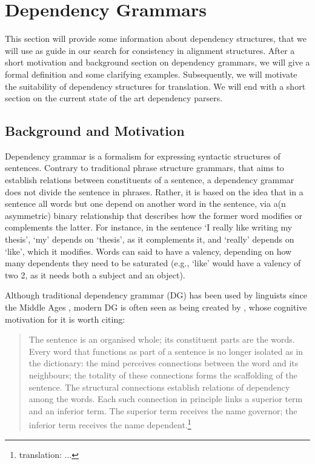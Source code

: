 \documentclass{report}
\theoremstyle{definition}
\theoremstyle{plain}
\begin{document}
\newpage

\section{Dependency Grammars}
\label{sec:depgram}

This section will provide some information about dependency structures, that we will use as guide in our search for consistency in alignment structures. After a short motivation and background section on dependency grammars, we will give a formal definition and some clarifying examples. Subsequently, we will motivate the suitability of dependency structures for translation. We will end with a short section on the current state of the art dependency parsers.

\subsection{Background and Motivation}

Dependency grammar is a formalism for expressing syntactic structures of sentences. Contrary to traditional phrase structure grammars, that aims to establish relations between constituents of a sentence, a dependency grammar does not divide the sentence in phrases. Rather, it is based on the idea that in a sentence all words but one depend on another word in the sentence, via a(n asymmetric) binary relationship that describes how the former word modifies or complements the latter. For instance, in the sentence `I really like writing my thesis', `my' depends on `thesis', as it complements it, and `really' depends on `like', which it modifies. Words can said to have a valency, depending on how many dependents they need to be saturated (e.g., `like' would have a valency of two 2, as it needs both a subject and an object).

Although traditional dependency grammar (DG) has been used by linguists since the Middle Ages \cite{covington1990dependency}, modern DG is often seen as being created by \cite{tesniere1959elements}, whose cognitive motivation for it is worth citing:

\begin{quote}
The sentence is an organised whole; its constituent parts are the words. Every word that functions as part of a sentence is no longer isolated as in the dictionary: the mind perceives connections between the word and its neighbours; the totality of these connections forms the scaffolding of the sentence. The structural connections establish relations of dependency among the words. Each such connection in principle links a superior term and an inferior term. The superior term receives the name governor; the inferior term receives the name dependent.\footnote{translation: ...}
\end{quote}
\end{document}
